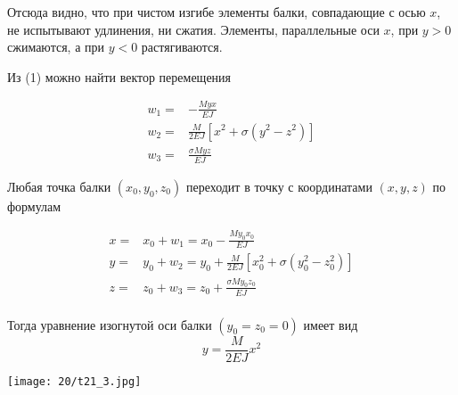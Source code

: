 Отсюда видно, что при чистом изгибе элементы балки, совпадающие с осью $x$, не испытывают удлинения, ни сжатия. Элементы, параллельные оси $x$, при $y>0$ сжимаются, а при $y<0$ растягиваются.

Из (1) можно найти вектор перемещения

\begin{equation}
  \begin{array}{cc}
    w_1 = & - \frac{Myx}{EJ}                        \\
    w_2 = & \frac{M}{2EJ}[x^2 + \sigma (y^2 - z^2)] \\
    w_3 = & \frac{\sigma Myz}{EJ}
  \end{array}
\end{equation}


Любая точка балки $(x_0, y_0, z_0)$ переходит в точку с координатами $(x, y, z)$ по формулам

\begin{equation}
  \begin{array}{cc}
    x = & x_0 + w_1 = x_0 - \frac{My_0x_0}{EJ}                            \\
    y = & y_0 + w_2 = y_0 + \frac{M}{2EJ}[x_0^2 + \sigma (y_0^2 - z_0^2)] \\
    z = & z_0 + w_3 = z_0 + \frac{\sigma My_0z_0}{EJ}                     \\
  \end{array}
\end{equation}

Тогда уравнение изогнутой оси балки $(y_0 = z_0 = 0)$ имеет вид
$$ y = \frac{M}{2EJ}x^2 $$

\texttt{[image: 20/t21\_3.jpg]}
